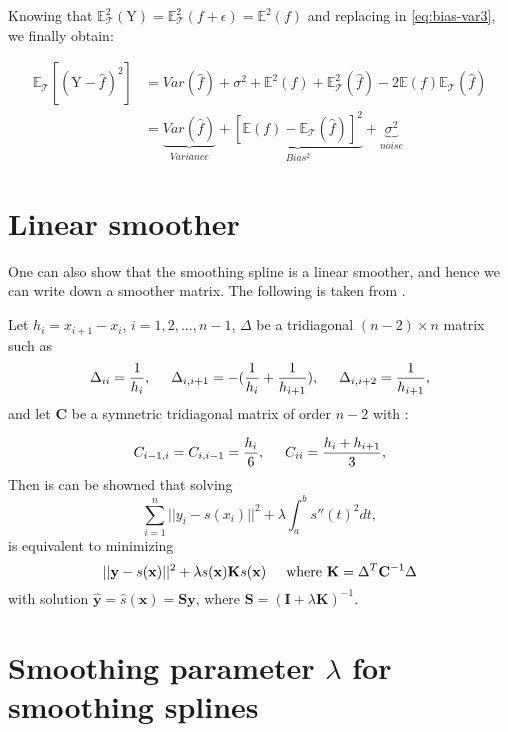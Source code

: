 \documentclass[]{book}
\begin{document}
Knowing that
\(\mathbb{E}_\mathcal{T}^2(\mathrm{Y}) = \mathbb{E}_\mathcal{T}^2(f + \epsilon) = \mathbb{E}^2(f)\)
and replacing in \eqref{eq:bias-var3}, we finally obtain:

\[\begin{aligned}
 \label{eq:bias-var4}
\mathbb{E}_\mathcal{T}[(\mathrm{Y} - \hat{f})^2] & = Var(\hat{f}) + \sigma^2 + \mathbb{E}^2(f) + \mathbb{E}_\mathcal{T}^2(\hat{f}) - 2\mathbb{E}(f)\mathbb{E}_\mathcal{T}(\hat{f}) \\ \nonumber
& = \underbrace{Var(\hat{f})}_{Variance} + \underbrace{[\mathbb{E}(f) - \mathbb{E}_\mathcal{T}(\hat{f})]^2}_{Bias^2} + \underbrace{\sigma^2}_{noise}\end{aligned}\]

\hypertarget{linsmooth}{%
\chapter{\texorpdfstring{Linear smoother \citep{buja_linear_1989}}{Linear smoother {[}@buja\_linear\_1989{]}}}\label{linsmooth}}

One can also show that the smoothing spline is a linear smoother, and
hence we can write down a smoother matrix. The following is taken from
\citep{green_semi-parametric_1985}.

Let \(h_i = x_{i+1} - x_i\), \(i = 1,2,\dots,n-1\), \(\Delta\) be a
tridiagonal \((n-2) \times n\) matrix such as
\[\Delta_{ii} = \frac{1}{h_i}, \hspace{.5cm} \Delta_{i,i+1} = -(\frac{1}{h_i}+\frac{1}{h_{i+1}}) , \hspace{.5cm} \Delta_{i,i+2} = \frac{1}{h_{i+1}},\]
and let \(\mathbf{C}\) be a symnetric tridiagonal matrix of order \(n-2\) with :

\[C_{i-1,i} = C_{i,i-1} = \frac{h_i}{6}, \hspace{.5cm} C_{ii} = \frac{h_i+h_{i+1}}{3},\]
Then is can be showned that solving
\[\sum_{i=1}^n||y_i - s(x_i)||^2 + \lambda \int_a^b{s''(t)}^2dt,\] is
equivalent to minimizing
\[|| \mathbf{y} - s(\mathbf{x})||^2 + \lambda s(\mathbf{x}) \mathbf{K} s(\mathbf{x}) \hspace{.5cm} \text{where } \mathbf{K} = \Delta^T \mathbf{C}^{-1} \Delta\]
with solution \(\hat{\mathbf{y}} = \hat{s}(\mathbf{x}) = \mathbf{S}\mathbf{y}\), where
\(\mathbf{S} = (\mathbf{I}+\lambda \mathbf{K})^{-1}\).

\hypertarget{lambdasmooth}{%
\chapter{\texorpdfstring{Smoothing parameter \(\lambda\) for smoothing splines}{Smoothing parameter \textbackslash{}lambda for smoothing splines}}\label{lambdasmooth}}
\end{document}

